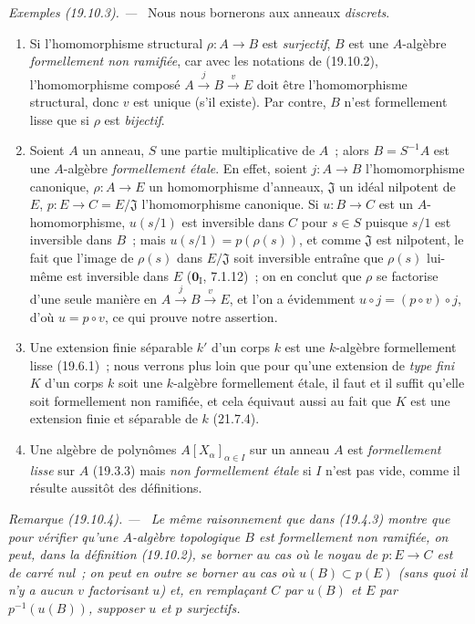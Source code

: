 \documentclass[10pt,oneside]{book}
\makeatletter
\newcommand{\setmanualcurrentlabel}[1]{\def\@currentlabel{#1}}
\newcommand{\oldpage}[2][]{%
  \setcounter{footnote}{0}%
  \marginpar{\scriptsize\textbf{#1}~|~#2}\ignorespaces}
\newenvironment{remark}[1][]{%
  \setmanualcurrentlabel{#1}\par\medskip\noindent\itshape Remarque (#1). ---\ }{\par}
\newenvironment{examples}[1][]{%
  \setmanualcurrentlabel{#1}\par\medskip\noindent\textit{Exemples (#1). ---}\ }{\par}
\makeatother
\begin{document}
\oldpage[0\textsubscript{IV-1}]{116}

\begin{examples}[19.10.3]
\label{0.19.10.3-fr}
Nous nous bornerons aux anneaux \emph{discrets}.
\begin{enumerate}
  \item[(i)] Si l'homomorphisme structural $\rho:A\to B$ est \emph{surjectif},
  $B$ est une $A$-algèbre \emph{formellement non ramifiée}, car avec les
  notations de (19.10.2), l'homomorphisme composé
  $A\xrightarrow{j}B\xrightarrow{v}E$ doit être l'homomorphisme structural,
  donc $v$ est unique (s'il existe). Par contre, $B$ n'est formellement lisse
  que si $\rho$ est \emph{bijectif}.
  \item[(ii)] Soient $A$ un anneau, $S$ une partie multiplicative de $A$~;
  alors $B=S^{-1}A$ est une $A$-algèbre \emph{formellement étale}. En effet,
  soient $j:A\to B$ l'homomorphisme canonique, $\rho:A\to E$ un homomorphisme
  d'anneaux, $\mathfrak J$ un idéal nilpotent de $E$,
  $p:E\to C=E/\mathfrak J$ l'homomorphisme canonique. Si $u:B\to C$ est un
  $A$-homomorphisme, $u(s/1)$ est inversible dans $C$ pour $s\in S$ puisque
  $s/1$ est inversible dans $B$~; mais $u(s/1)=p(\rho(s))$, et comme
  $\mathfrak J$ est nilpotent, le fait que l'image de $\rho(s)$ dans
  $E/\mathfrak J$ soit inversible entraîne que $\rho(s)$ lui-même est
  inversible dans $E$ ($\mathbf 0_{\mathrm I}$, 7.1.12)~; on en conclut que
  $\rho$ se factorise d'une seule manière en
  $A\xrightarrow{j}B\xrightarrow{v}E$, et l'on a évidemment
  $u\circ j=(p\circ v)\circ j$, d'où $u=p\circ v$, ce qui prouve notre
  assertion.
  \item[(iii)] Une extension finie séparable $k'$ d'un corps $k$ est une
  $k$-algèbre formellement lisse (19.6.1)~; nous verrons plus loin que pour
  qu'une extension de \emph{type fini} $K$ d'un corps $k$ soit une $k$-algèbre
  formellement étale, il faut et il suffit qu'elle soit formellement non
  ramifiée, et cela équivaut aussi au fait que $K$ est une extension finie et
  séparable de $k$ (21.7.4).
  \item[(iv)] Une algèbre de polynômes $A[X_\alpha]_{\alpha\in I}$ sur un
  anneau $A$ est \emph{formellement lisse} sur $A$ (19.3.3) mais \emph{non
  formellement étale} si $I$ n'est pas vide, comme il résulte aussitôt des
  définitions.
\end{enumerate}
\end{examples}

\begin{remark}[19.10.4]
\label{0.19.10.4-fr}
Le même raisonnement que dans (19.4.3) montre que pour vérifier qu'une
$A$-algèbre topologique $B$ est formellement non ramifiée, on peut, dans la
définition (19.10.2), se borner au cas où le noyau de $p:E\to C$ est de
\emph{carré nul}~; on peut en outre se borner au cas où $u(B)\subset p(E)$
(sans quoi il n'y a aucun $v$ factorisant $u$) et, en remplaçant $C$ par $u(B)$
et $E$ par $p^{-1}(u(B))$, supposer $u$ et $p$ surjectifs.
\end{remark}
\end{document}
